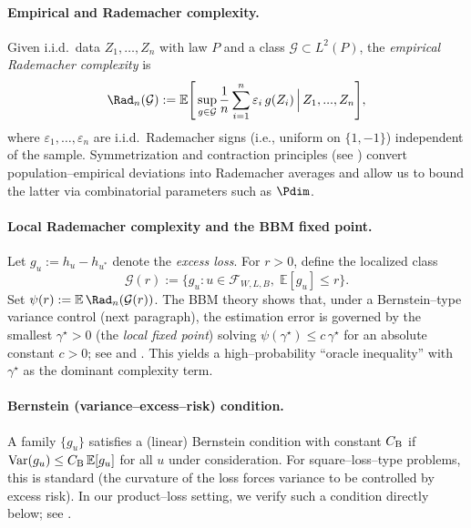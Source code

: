 \documentclass[pdflatex,sn-mathphys-ay]{sn-jnl}%
\numberwithin{equation}{section}
\theoremstyle{thmstyleone}%
\theoremstyle{thmstyletwo}%
\theoremstyle{thmstylethree}%
\begin{document}
\paragraph{Empirical and Rademacher complexity.}
Given i.i.d.\ data \(Z_1,\ldots,Z_n\) with law \(P\) and a class \(\mathcal{G}\subset L^2(P)\), the \emph{empirical Rademacher complexity} is
\begin{equation*}
\Rad_n(\mathcal{G}) := \mathbb{E}\Bigg[\sup_{g\in\mathcal{G}} \frac{1}{n}\sum_{i=1}^n \varepsilon_i\, g(Z_i)\,\Big|\,Z_1,...,Z_n\Bigg],
\end{equation*}
where \(\varepsilon_1,\ldots,\varepsilon_n\) are i.i.d.\ Rademacher signs (i.e., uniform on $\{1,-1\}$) independent of the sample.  Symmetrization and contraction principles (see \cite[Sec.\ 2--3]{bartlett2005local}) convert population–empirical deviations into Rademacher averages and allow us to bound the latter via combinatorial parameters such as \(\Pdim\).

\paragraph{Local Rademacher complexity and the BBM fixed point.}
Let \(g_u:=h_u-h_{u^*}\) denote the \emph{excess loss}.  For \(r>0\), define the localized class
\begin{equation*}
\mathcal{G}(r):=\big\{ g_u : u\in\mathcal{F}_{W,L,B},\;\mathbb{E}[g_u]\le r\big\}.
\end{equation*}
Set \(\psi(r):=\mathbb{E}\,\Rad_n(\mathcal{G}(r))\).  The BBM theory shows that, under a Bernstein–type variance control (next paragraph), the estimation error is governed by the smallest \(\gamma^\star>0\) (the \emph{local fixed point}) solving \(\psi(\gamma^\star)\le c\,\gamma^\star\) for an absolute constant \(c>0\); see \cite[Theorem 3.3 \& 3.5]{bartlett2005local} and \cite[Section 3]{koltchinskii2006local}.  This yields a high–probability ``oracle inequality'' with \(\gamma^\star\) as the dominant complexity term.

\paragraph{Bernstein (variance–excess–risk) condition.}
A family \(\{g_u\}\) satisfies a (linear) Bernstein condition with constant \(C_{\rm B}\) if
\(
\operatorname{Var}(g_u)\le C_{\rm B}\,\mathbb{E}[g_u]
\)
for all \(u\) under consideration.  For square–loss–type problems, this is standard (the curvature of the loss forces variance to be controlled by excess risk).  In our product–loss setting, we verify such a condition directly below; see \cite{bartlett2005local,koltchinskii2006local}.
\end{document}
